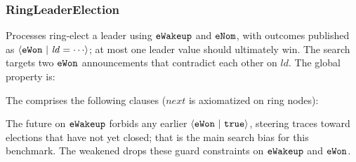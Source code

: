 \subsubsection*{RingLeaderElection}
Processes ring-elect a leader using \(\boldsymbol{{\tt eWakeup}}\) and \(\boldsymbol{{\tt eNom}}\), with outcomes published as \({\langle} {\boldsymbol{{\tt eWon}}~|~{\mathit{ld}=\cdots}} {\rangle}\); at most one leader value should ultimately win. The search targets two \(\boldsymbol{{\tt eWon}}\) announcements that contradict each other on \(\mathit{ld}\). The global property is:
\vspace{-.35cm}\par{}
\vspace{-.4cm}\par\nobreak\noindent
The \tyName{} comprises the following clauses (\(\mathit{next}\) is axiomatized on ring nodes):
\vspace{-.35cm}\par{}
\vspace{-.4cm}\par\nobreak\noindent
The future on \(\boldsymbol{{\tt eWakeup}}\) forbids any earlier \({\langle} {\boldsymbol{{\tt eWon}}~|~{{\tt true}}} {\rangle}\), steering traces toward elections that have not yet closed; that is the main search bias for this benchmark. The weakened \tyName{} drops these guard constraints on \(\boldsymbol{{\tt eWakeup}}\) and \(\boldsymbol{{\tt eWon}}\).

\newpage
